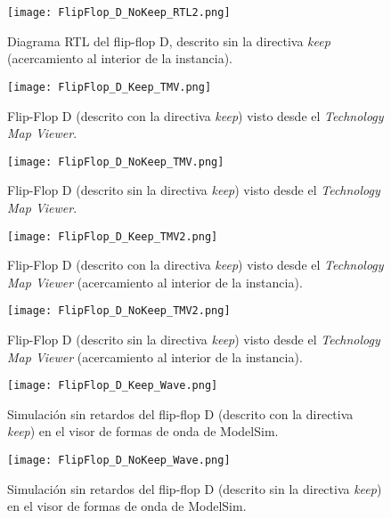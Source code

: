 \begin{figure}[ht]
	\centering
	\texttt{[image: FlipFlop\_D\_NoKeep\_RTL2.png]}
	\caption{Diagrama RTL del flip-flop D, descrito sin la directiva \textit{keep} (acercamiento al interior de la instancia). \label{fig:FlipFlop_D_NoKeep_RTL2}}
\end{figure}

\begin{figure}[ht]
	\centering
	\texttt{[image: FlipFlop\_D\_Keep\_TMV.png]}
	\caption{Flip-Flop D (descrito con la directiva \textit{keep}) visto desde el \textit{Technology Map Viewer}. \label{fig:FlipFlop_D_Keep_TMV}}
\end{figure}

\begin{figure}[ht]
	\centering
	\texttt{[image: FlipFlop\_D\_NoKeep\_TMV.png]}
	\caption{Flip-Flop D (descrito sin la directiva \textit{keep}) visto desde el \textit{Technology Map Viewer}. \label{fig:FlipFlop_D_NoKeep_TMV}}
\end{figure}

\begin{figure}[ht]
	\centering
	\texttt{[image: FlipFlop\_D\_Keep\_TMV2.png]}
	\caption{Flip-Flop D (descrito con la directiva \textit{keep}) visto desde el \textit{Technology Map Viewer} (acercamiento al interior de la instancia). \label{fig:FlipFlop_D_Keep_TMV2}}
\end{figure}

\begin{figure}[ht]
	\centering
	\texttt{[image: FlipFlop\_D\_NoKeep\_TMV2.png]}
	\caption{Flip-Flop D (descrito sin la directiva \textit{keep}) visto desde el \textit{Technology Map Viewer} (acercamiento al interior de la instancia). \label{fig:FlipFlop_D_NoKeep_TMV2}}
\end{figure}

\begin{figure}[ht]
	\centering
	\texttt{[image: FlipFlop\_D\_Keep\_Wave.png]}
	\caption{Simulación sin retardos del flip-flop D (descrito con la directiva \textit{keep}) en el visor de formas de onda de ModelSim. \label{fig:FlipFlop_D_Keep_Wave}}
\end{figure}

\begin{figure}[ht]
	\centering
	\texttt{[image: FlipFlop\_D\_NoKeep\_Wave.png]}
	\caption{Simulación sin retardos del flip-flop D (descrito sin la directiva \textit{keep}) en el visor de formas de onda de ModelSim. \label{fig:FlipFlop_D_NoKeep_Wave}}
\end{figure}

